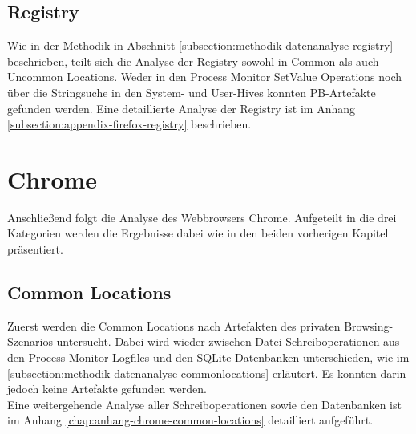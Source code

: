 \subsection*{Registry}
Wie in der Methodik in Abschnitt \ref{subsection:methodik-datenanalyse-registry} beschrieben, teilt sich die Analyse der Registry sowohl in Common als auch Uncommon Locations. Weder in den Process Monitor \glqq{}SetValue\grqq{} Operations noch über die Stringsuche in den System- und User-Hives konnten PB-Artefakte gefunden werden. Eine detaillierte Analyse der Registry ist im Anhang \ref{subsection:appendix-firefox-registry} beschrieben. 

\pagebreak

\section{Chrome}\label{chap:ergebnisse-chrome}

Anschließend folgt die Analyse des Webbrowsers Chrome. Aufgeteilt in die drei Kategorien werden die Ergebnisse dabei wie in den beiden vorherigen Kapitel präsentiert.

\subsection*{Common Locations}\label{chap:ergebnisse-chrome-common-location}

Zuerst werden die Common Locations nach Artefakten des privaten Browsing-Szenarios untersucht. Dabei wird wieder zwischen Datei-Schreiboperationen aus den Process Monitor Logfiles und den SQLite-Datenbanken unterschieden, wie im \autoref{subsection:methodik-datenanalyse-commonlocations} erläutert. Es konnten darin jedoch keine Artefakte gefunden werden.\\
Eine weitergehende Analyse aller Schreiboperationen sowie den Datenbanken ist im Anhang \ref{chap:anhang-chrome-common-locations} detailliert aufgeführt.

